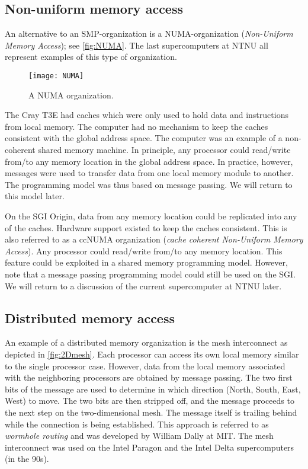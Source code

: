\subsection{Non-uniform memory access}

An alternative to an SMP-organization is a NUMA-organization (\emph{Non-Uniform
Memory Access}); see \autoref{fig:NUMA}. The last supercomputers at NTNU all
represent examples of this type of organization.

\begin{figure}[htbp]
  \begin{center}
    \texttt{[image: NUMA]}
  \end{center}
  \caption{A NUMA organization.}
  \label{fig:NUMA}
\end{figure}

The Cray T3E had caches which were only used to hold data and instructions from
local memory. The computer had no mechanism to keep the caches consistent with
the global address space. The computer was an example of a non-coherent shared
memory machine. In principle, any processor could read/write from/to any memory
location in the global address space. In practice, however, messages were used
to transfer data from one local memory module to another. The programming model
was thus based on message passing. We will return to this model later.

On the SGI Origin, data from any memory location could be replicated into any of
the caches. Hardware support existed to keep the caches consistent. This is also
referred to as a ccNUMA organization (\emph{cache coherent Non-Uniform Memory
Access}). Any processor could read/write from/to any memory location. This
feature could be exploited in a shared memory programming model. However, note
that a message passing programming model could still be used on the SGI. We will
return to a discussion of the current supercomputer at NTNU later.

\subsection{Distributed memory access}

An example of a distributed memory organization is the mesh interconnect as
depicted in \autoref{fig:2Dmesh}. Each processor can access its own local memory
similar to the single processor case. However, data from the local memory
associated with the neighboring processors are obtained by message passing. The
two first bits of the message are used to determine in which direction (North,
South, East, West) to move. The two bits are then stripped off, and the message
proceeds to the next step on the two-dimensional mesh. The message itself is
trailing behind while the connection is being established. This approach is
referred to as \emph{wormhole routing} and was developed by William Dally at
MIT. The mesh interconnect was used on the Intel Paragon and the Intel Delta
supercomputers (in the 90s).

